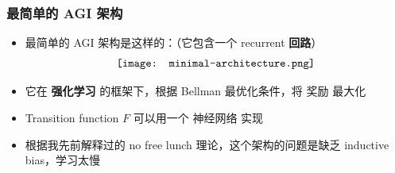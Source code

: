 \documentclass[15pt]{beamer}
\newcommand{\cc}[2]{#1}
\newcommand{\cc}[2]{#2}
\newif\ifframeinlbf
\begin{document}
\frameinlbftrue
\begin{frame}
\frametitle{\cc{最简单的 AGI 架构}{The simplest AGI architecture}}
\begin{itemize}
	\item \cc{
	最简单的 AGI 架构是这样的：（它包含一个 recurrent \textbf{回路}）}{
	The simplest AGI architecture consists of a single recurrent loop:
	}
	\begin{equation}
	\vcenter{\hbox{\texttt{[image: minimal-architecture.png]}}}
	\end{equation}

	\item \cc{
	它在 \textbf{强化学习} 的框架下，根据 Bellman 最优化条件，将 奖励 最大化}{
	It operates under reinforcement learning, maximizing rewards by the Bellman optimality condition
	}

	\item \cc{
	Transition function $F$ 可以用一个 神经网络 实现}{
	The transition function $F$ can be implemented by a neural network
	}
	
	\item \cc{
	根据我先前解释过的 no free lunch 理论，这个架构的问题是缺乏 inductive bias，学习太慢}{
	According to No Free Lunch theorem, problem with this architecture is lack of inductive bias, learning is too slow
	}
	
\end{itemize}
\end{frame}
\end{document}
